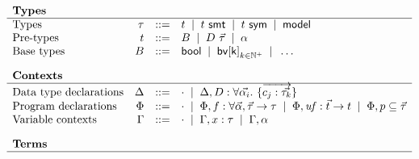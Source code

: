 \documentclass[acmsmall,screen,nonacm]{acmart}
\newcommand{\BNFALT}{\;\;|\;\;}
\theoremstyle{definition}
\begin{document}
\begin{figure}[t]
  \[ \begin{array}{lrcl}
    \multicolumn{4}{l}{\textbf{Types}} \\ \hline
    \text{Types}        & \tau   &::=& t \BNFALT \smt{t} \BNFALT \sym{t} \BNFALT \MODEL \\
    \text{Pre-types}    & t      &::=& B \BNFALT D ~ \vec{\tau} \BNFALT \alpha \\
    \text{Base types}   & B      &::=& \bool \BNFALT \bv{k}_{k \in {\mathbb{N}^+}} \BNFALT \dots \\[1em]
    
    \multicolumn{4}{l}{\textbf{Contexts}} \\ \hline
    \text{Data type declarations} & \Delta &::=& \cdot \BNFALT \Delta, D:\forall \vec{\alpha_i}. ~ \{ \overrightarrow{c_j : \vec{\tau_k}} \} \\
    \text{Program declarations}  & \Phi   &::=&
      \cdot \BNFALT
      \Phi, f:\forall \vec{\alpha}, \vec{\tau} \rightarrow \tau \BNFALT
      \Phi, \uf:\vec{t} \rightarrow t \BNFALT
      \Phi, p \subseteq \vec{\tau} \\
    \text{Variable contexts}    & \Gamma &::=&
      \cdot \BNFALT
      \Gamma, x:\tau \BNFALT
      \Gamma, \alpha \\[1em]
    
    \multicolumn{4}{l}{\textbf{Terms}} \\ \hline


\end{array}\]
\end{figure}
\end{document}
